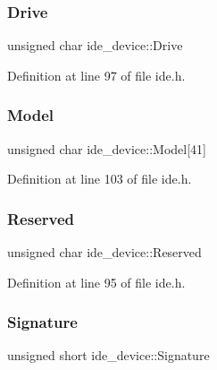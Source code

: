 \subsubsection{\texorpdfstring{Drive}{Drive}}
{\footnotesize\ttfamily unsigned char ide\+\_\+device\+::\+Drive}



Definition at line 97 of file ide.\+h.

\mbox{\label{structide__device_a8528ca17136240ce55c9441d68711e78_a8528ca17136240ce55c9441d68711e78}} 
\subsubsection{\texorpdfstring{Model}{Model}}
{\footnotesize\ttfamily unsigned char ide\+\_\+device\+::\+Model\mbox{[}41\mbox{]}}



Definition at line 103 of file ide.\+h.

\mbox{\label{structide__device_a293fdfa780f639d9eb98fcf664699b08_a293fdfa780f639d9eb98fcf664699b08}} 
\subsubsection{\texorpdfstring{Reserved}{Reserved}}
{\footnotesize\ttfamily unsigned char ide\+\_\+device\+::\+Reserved}



Definition at line 95 of file ide.\+h.

\mbox{\label{structide__device_ad31d088a8fd56a5760a2bcff6891f21d_ad31d088a8fd56a5760a2bcff6891f21d}} 
\subsubsection{\texorpdfstring{Signature}{Signature}}
{\footnotesize\ttfamily unsigned short ide\+\_\+device\+::\+Signature}



